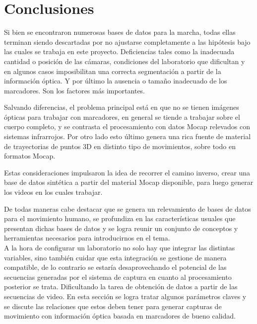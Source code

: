  


\section{Conclusiones} 

Si bien se encontraron numerosas bases de datos para la marcha, todas ellas terminan siendo descartadas por no ajustarse completamente a las hipótesis bajo las cuales se trabaja en este proyecto. Deficiencias tales como la inadecuada cantidad o posición de las cámaras, condiciones del laboratorio que dificultan y en algunos casos imposibilitan una correcta segmentación a partir de la información óptica. Y por último la ausencia o tamaño inadecuado de los marcadores. Son los factores más importantes.


Salvando diferencias, el problema principal está en que no se tienen imágenes ópticas para trabajar con marcadores, en general se tiende a trabajar sobre el cuerpo completo, y se contrasta el procesamiento con datos Mocap relevados con sistemas infrarrojos. Por otro lado esto último genera una rica fuente de material de trayectorias de puntos 3D en distinto tipo de movimientos, sobre todo en formatos Mocap.



Estas consideraciones impulsaron la idea de recorrer el camino inverso, crear una base de datos sintética a partir del material Mocap disponible, para luego generar los videos en los cuales trabajar.  


De todas maneras cabe destacar que se genera un relevamiento de bases de datos para el movimiento humano, se profundiza en las características usuales que presentan dichas bases de datos y se logra reunir un conjunto de conceptos y herramientas necesarios para introducirnos en el tema. \\



A la hora de configurar un laboratorio no solo hay que integrar las distintas variables, sino también cuidar que esta integración se gestione de manera compatible, de lo contrario se estaría desaprovechando el potencial de las secuencias generadas por el sistema de captura en cuanto al procesamiento posterior se trata. Dificultando la tarea de obtención de datos a partir de las secuencias de video.
En esta sección se logra tratar algunos parámetros claves y se discute las relaciones que estos deben tener para generar capturas de movimiento con información óptica basada en marcadores de bueno calidad.


